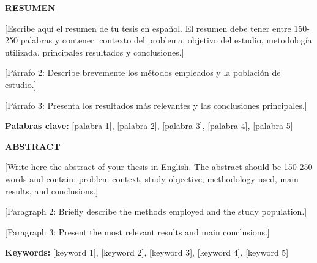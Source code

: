 \documentclass[12pt,letterpaper,oneside]{report}
\begin{document}
\newpage
{}  %
\setcounter{page}{1}
\thispagestyle{empty}

{\centering
{\fontsize{14}{16}\selectfont\bfseries RESUMEN}\\[1cm]
}

\setlength{\parindent}{1.27cm}
\onehalfspacing
\setlength{\parskip}{6pt plus 2pt minus 1pt}

[Escribe aqu\'i el resumen de tu tesis en espa\~nol. El resumen debe tener entre 150-250 palabras y contener: contexto del problema, objetivo del estudio, metodolog\'ia utilizada, principales resultados y conclusiones.]

[P\'arrafo 2: Describe brevemente los m\'etodos empleados y la poblaci\'on de estudio.]

[P\'arrafo 3: Presenta los resultados m\'as relevantes y las conclusiones principales.]

\vspace{0.5cm}
\noindent\textbf{Palabras clave:} [palabra 1], [palabra 2], [palabra 3], [palabra 4], [palabra 5]

\newpage
\thispagestyle{empty}

{\centering
{\fontsize{14}{16}\selectfont\bfseries ABSTRACT}\\[1cm]
}

\setlength{\parindent}{1.27cm}
\onehalfspacing
\setlength{\parskip}{6pt plus 2pt minus 1pt}

[Write here the abstract of your thesis in English. The abstract should be 150-250 words and contain: problem context, study objective, methodology used, main results, and conclusions.]

[Paragraph 2: Briefly describe the methods employed and the study population.]

[Paragraph 3: Present the most relevant results and main conclusions.]

\vspace{0.5cm}
\noindent\textbf{Keywords:} [keyword 1], [keyword 2], [keyword 3], [keyword 4], [keyword 5]

\newpage
\thispagestyle{empty}
\end{document}
